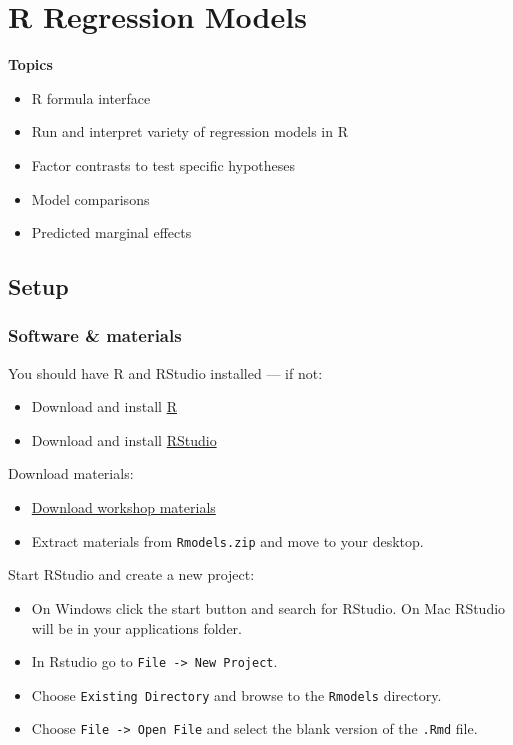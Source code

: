 \documentclass[]{book}
\providecommand{\tightlist}{%
  \setlength{\itemsep}{0pt}\setlength{\parskip}{0pt}}
\begin{document}
\chapter{R Regression Models}\label{r-regression-models}

\textbf{Topics}

\begin{itemize}
\tightlist
\item
  R formula interface
\item
  Run and interpret variety of regression models in R
\item
  Factor contrasts to test specific hypotheses
\item
  Model comparisons
\item
  Predicted marginal effects
\end{itemize}

\section{Setup}\label{setup-1}

\subsection{Software \& materials}\label{software-materials-1}

You should have R and RStudio installed --- if not:

\begin{itemize}
\tightlist
\item
  Download and install \href{http://cran.r-project.org}{R}
\item
  Download and install
  \href{https://www.rstudio.com/products/rstudio/download/\#download}{RStudio}
\end{itemize}

Download materials:

\begin{itemize}
\tightlist
\item
  \href{http://tutorials.iq.harvard.edu/R/Rmodels.zip}{Download workshop
  materials}
\item
  Extract materials from \texttt{Rmodels.zip} and move to your desktop.
\end{itemize}

Start RStudio and create a new project:

\begin{itemize}
\tightlist
\item
  On Windows click the start button and search for RStudio. On Mac
  RStudio will be in your applications folder.
\item
  In Rstudio go to \texttt{File\ -\textgreater{}\ New\ Project}.
\item
  Choose \texttt{Existing\ Directory} and browse to the \texttt{Rmodels}
  directory.
\item
  Choose \texttt{File\ -\textgreater{}\ Open\ File} and select the blank
  version of the \texttt{.Rmd} file.
\end{itemize}
\end{document}
